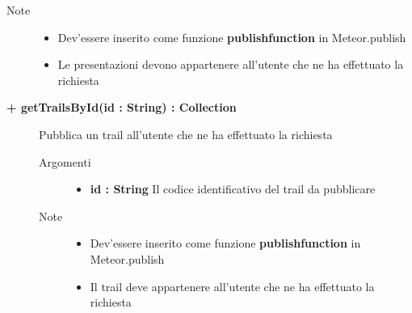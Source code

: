 \begin{description}
\begin{description}
		\begin{description}
			
			\item[Note] \hfill
			\begin{itemize}
					\item Dev'essere inserito come funzione \textbf{publishfunction} in Meteor.publish
					\item Le presentazioni devono appartenere all'utente che ne ha effettuato la richiesta
				\end{itemize}
		\end{description}
	\end{description}
	
	\begin{description}
		\item[\textbf{\color{blue}+ getTrailsById(id : String) : Collection			}] \hfill
			Pubblica un trail all'utente che ne ha effettuato la richiesta
			
		\begin{description}
			\item[Argomenti] \hfill
				\begin{itemize}
				
					\item \textbf{id : String			} \hfill
					Il codice identificativo del trail da pubblicare
					
				\end{itemize}
			\item[Note] \hfill
			\begin{itemize}
					\item Dev'essere inserito come funzione \textbf{publishfunction} in Meteor.publish
					\item Il trail deve appartenere all'utente che ne ha effettuato la richiesta
				\end{itemize}
		\end{description}
	\end{description}
	
	
	
	
\end{description}










